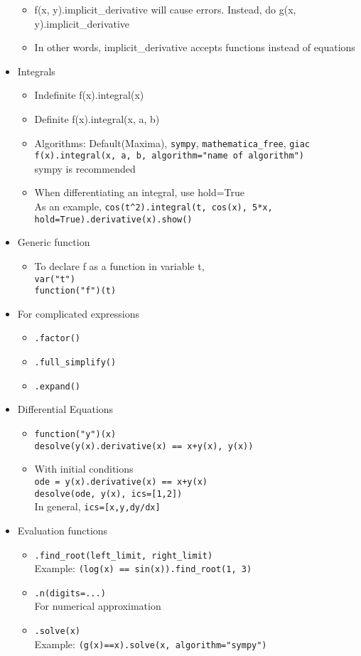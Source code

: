 \documentclass{article}
\newcommand{\code}{\texttt}
\begin{document}
\begin{itemize}
\begin{itemize}
		\item f(x, y).implicit\_derivative will cause errors. Instead, do g(x, y).implicit\_derivative
		\item In other words, implicit\_derivative accepts functions instead of equations
	\end{itemize}
	\item Integrals
	\begin{itemize}
		\item Indefinite f(x).integral(x)
		\item Definite f(x).integral(x, a, b)
		\item Algorithms: Default(Maxima), \code{sympy}, \code{mathematica\_free}, \code{giac}\\
		\code{f(x).integral(x, a, b, algorithm="name of algorithm")}\\
		sympy is recommended
		\item When differentiating an integral, use hold=True\\
		As an example, \code{cos(t\^{}2).integral(t, cos(x), 5*x, hold=True).derivative(x).show()}
	\end{itemize}
	\item Generic function
	\begin{itemize}
		\item To declare f as a function in variable t,\\
		\code{var("t")}\\
		\code{function("f")(t)}
	\end{itemize}
	\item For complicated expressions
	\begin{itemize}
		\item \code{.factor()}
		\item \code{.full\_simplify()}
		\item \code{.expand()}
	\end{itemize}
	\item Differential Equations
	\begin{itemize}
		\item \code{function("y")(x)}\\
		\code{desolve(y(x).derivative(x) == x+y(x), y(x))}
		\item With initial conditions\\
		\code{ode = y(x).derivative(x) == x+y(x)\\
		desolve(ode, y(x), ics=[1,2])}\\
		In general, \code{ics=[x,y,dy/dx]}
	\end{itemize}
	\item Evaluation functions
	\begin{itemize}
		\item \code{.find\_root(left\_limit, right\_limit)}\\
		Example: \code{(log(x) == sin(x)).find\_root(1, 3)}
		\item \code{.n(digits=...)}\\
		For numerical approximation
		\item \code{.solve(x)}\\
		Example: \code{(g(x)==x).solve(x, algorithm="sympy")}
		

\end{itemize}
\end{itemize}
\end{document}
